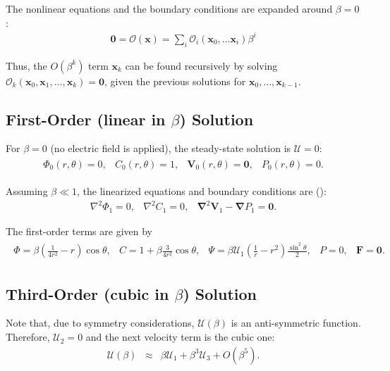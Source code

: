\documentclass[10pt]{ijnam}
\newcommand{\pars}[1]{\left(#1\right)}
\newcommand\Laplacian{\nabla^2}
\newcommand\bnabla{\boldsymbol{\nabla}}
\newcommand\bLaplacian{\boldsymbol{\nabla}^2}
\newcommand\bV{\boldsymbol{V}}
\newcommand\bF{\boldsymbol{F}}
\newcommand\bx{\boldsymbol{x}}
\newcommand\bzero{\boldsymbol{0}}
\newcommand\cO{\mathcal{O}}
\newcommand\cU{\mathscr{U}}
\begin{document}
The nonlinear equations and the boundary conditions 
are expanded around $\beta = 0$:
\begin{eqnarray*}
\bzero = \cO(\bx) = \sum_i \cO_i(\bx_0, \ldots \bx_i) \beta^i
\end{eqnarray*}

Thus, the $O(\beta^k)$ term $\bx_k$ can be found recursively by solving 
$\cO_k(\bx_0, \bx_1, \ldots, \bx_k) = \bzero$,
given the previous solutions for $\bx_0, \ldots, \bx_{k-1}$.

\subsection{First-Order (linear in $\beta$) Solution} \label{app:linear}

For $\beta = 0$ (no electric field is applied), the steady-state solution is $\cU = 0$:
\begin{eqnarray*}\begin{array}{cccc}
\varPhi_0(r,\theta) = 0, &
C_0(r,\theta) = 1, &
\bV_0(r,\theta) = \bzero, &
P_0(r,\theta) = 0.
\end{array}\end{eqnarray*}

Assuming $\beta \ll 1$, the linearized equations and boundary conditions are 
(\cite{yariv2010migration}):
\begin{eqnarray*}
\Laplacian \varPhi_1 = 0, &
\Laplacian C_1 = 0, &
\bLaplacian \bV_1 - \bnabla P_1 = \bzero.
\end{eqnarray*}

The first-order terms are given by
\begin{eqnarray*}
\begin{array}{ccccc}
\varPhi = \beta \pars{\frac{1}{4r^2} - r}\cos\theta, &
C = 1 + \beta \frac{3}{4r^2} \cos\theta, &
\Psi = \beta \cU_1 \pars{\frac{1}{r} - r^2} \frac{\sin^2\theta}{2}, &
P = 0, &
\bF = \bzero.
\end{array}
\end{eqnarray*}

\subsection{Third-Order (cubic in $\beta$) Solution} \label{app:cubic}
Note that, due to symmetry considerations, $\cU(\beta)$ is an anti-symmetric function.
Therefore, $\cU_2 = 0$ and the next velocity term is the cubic one:
\begin{eqnarray*}
\cU(\beta) &\approx& \beta \cU_1 + \beta^3 \cU_3 + O(\beta^5).
\end{eqnarray*}
\end{document}
